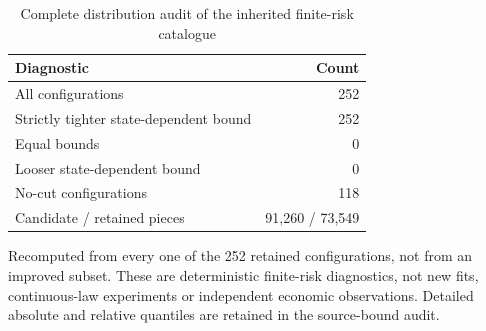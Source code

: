\begin{table}[htbp]
\caption{Complete distribution audit of the inherited finite-risk catalogue}\label{tab:diagnostics95}
\centering\small
\begin{tabular}{@{}lr@{}}
\toprule
Diagnostic & Count\\\midrule
All configurations & 252\\
Strictly tighter state-dependent bound & 252\\
Equal bounds & 0\\
Looser state-dependent bound & 0\\
No-cut configurations & 118\\
Candidate / retained pieces & 91,260 / 73,549\\
\bottomrule
\end{tabular}
\par\smallskip\begin{minipage}{.98\linewidth}\footnotesize Recomputed from every one of the 252 retained configurations, not from an improved subset. These are deterministic finite-risk diagnostics, not new fits, continuous-law experiments or independent economic observations. Detailed absolute and relative quantiles are retained in the source-bound audit.\end{minipage}
\end{table}
